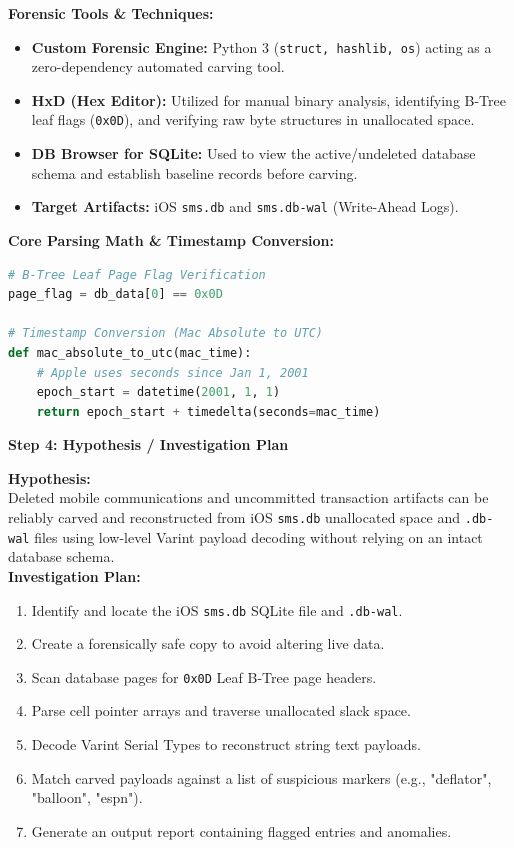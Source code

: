 \documentclass[11pt, a4paper]{article}
\begin{document}
\vspace{0.3cm}
\noindent\textbf{Forensic Tools \& Techniques:}
\begin{itemize}
    \item \textbf{Custom Forensic Engine:} Python 3 (\texttt{struct, hashlib, os}) acting as a zero-dependency automated carving tool.
    \item \textbf{HxD (Hex Editor):} Utilized for manual binary analysis, identifying B-Tree leaf flags (\texttt{0x0D}), and verifying raw byte structures in unallocated space.
    \item \textbf{DB Browser for SQLite:} Used to view the active/undeleted database schema and establish baseline records before carving.
    \item \textbf{Target Artifacts:} iOS \texttt{sms.db} and \texttt{sms.db-wal} (Write-Ahead Logs).
\end{itemize}

\vspace{0.3cm}
\noindent\textbf{Core Parsing Math \& Timestamp Conversion:}
\begin{lstlisting}[language=python]
# B-Tree Leaf Page Flag Verification
page_flag = db_data[0] == 0x0D

# Timestamp Conversion (Mac Absolute to UTC)
def mac_absolute_to_utc(mac_time):
    # Apple uses seconds since Jan 1, 2001
    epoch_start = datetime(2001, 1, 1)
    return epoch_start + timedelta(seconds=mac_time)
\end{lstlisting}

\vspace{0.6cm}
\noindent\textcolor{sectionblue}{\Large\textbf{Step 4: Hypothesis / Investigation Plan}}

\vspace{0.3cm}
\noindent\textbf{Hypothesis:}\\
Deleted mobile communications and uncommitted transaction artifacts can be reliably carved and reconstructed from iOS \texttt{sms.db} unallocated space and \texttt{.db-wal} files using low-level Varint payload decoding without relying on an intact database schema.\\

\vspace{0.3cm}
\noindent\textbf{Investigation Plan:}
\begin{enumerate}
    \item Identify and locate the iOS \texttt{sms.db} SQLite file and \texttt{.db-wal}.
    \item Create a forensically safe copy to avoid altering live data.
    \item Scan database pages for \texttt{0x0D} Leaf B-Tree page headers.
    \item Parse cell pointer arrays and traverse unallocated slack space.
    \item Decode Varint Serial Types to reconstruct string text payloads.
    \item Match carved payloads against a list of suspicious markers (e.g., "deflator", "balloon", "espn").
    \item Generate an output report containing flagged entries and anomalies.
\end{enumerate}
\end{document}
